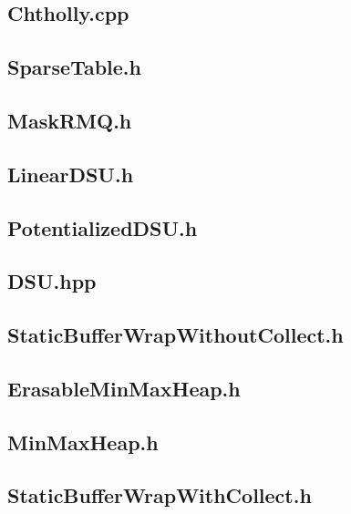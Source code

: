 \subsection{Chtholly.cpp}

\subsection{SparseTable.h}

\subsection{MaskRMQ.h}

\subsection{LinearDSU.h}

\subsection{PotentializedDSU.h}

\subsection{DSU.hpp}

\subsection{StaticBufferWrapWithoutCollect.h}

\subsection{ErasableMinMaxHeap.h}

\subsection{MinMaxHeap.h}

\subsection{StaticBufferWrapWithCollect.h}

